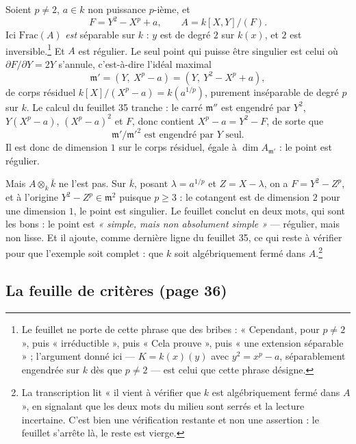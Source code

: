 \documentclass[11pt,a4paper]{article}
\begin{document}
Soient $p \neq 2$, $a \in k$ non puissance $p$-ième, et
\[
  F = Y^{2} - X^{p} + a , \qquad A = k[X,Y]/(F) .
\]
Ici $\mathrm{Frac}(A)$ \emph{est} séparable sur $k$ : $y$ est de degré $2$ sur
$k(x)$, et $2$ est inversible.\footnote{Le feuillet ne porte de cette phrase que des bribes : « Cependant,
pour $p \neq 2$ », puis « irréductible », puis « Cela prouve », puis « une
extension séparable » ; l'argument donné ici — $K = k(x)(y)$
avec $y^2 = x^p - a$, séparablement engendrée sur $k$ dès que $p \neq 2$ — est
celui que cette phrase désigne.} Et $A$ est régulier. Le seul point qui puisse
être singulier est celui où $\partial F/\partial Y = 2Y$ s'annule, c'est-à-dire
l'idéal maximal
\[
  \mathfrak{m}' = (Y,\ X^{p} - a) = (Y,\ Y^{2} - X^{p} + a) ,
\]
de corps résiduel $k[X]/(X^{p}-a) = k(a^{1/p})$, purement inséparable de degré
$p$ sur $k$. Le calcul du feuillet 35 tranche : le carré $\mathfrak{m}''$ est
engendré par $Y^{2}$, $Y(X^{p}-a)$, $(X^{p}-a)^{2}$ et $F$, donc contient
$X^{p}-a = Y^{2} - F$, de sorte que
\[
  \mathfrak{m}'/\mathfrak{m}'^{2} \text{ est engendré par } Y \text{ seul} .
\]
Il est donc de dimension $1$ sur le corps résiduel, égale à
$\dim A_{\mathfrak{m}'}$ : le point est régulier.

Mais $A \otimes_{k} \overline{k}$ ne l'est pas. Sur $\overline{k}$, posant
$\lambda = a^{1/p}$ et $Z = X - \lambda$, on a $F = Y^{2} - Z^{p}$, et à
l'origine $Y^{2} - Z^{p} \in \mathfrak{m}^{2}$ puisque $p \geqslant 3$ : le
cotangent est de dimension $2$ pour une dimension $1$, le point est singulier.
Le feuillet conclut en deux mots, qui sont les bons : le point est
\emph{« simple, mais non absolument simple »} — régulier, mais non lisse. Et il
ajoute, comme dernière ligne du feuillet 35, ce qui reste à vérifier pour que
l'exemple soit complet : que $k$ soit algébriquement fermé dans
$A$.\footnote{La transcription lit « il vient à vérifier que $k$ est
algébriquement fermé dans $A$ », en signalant que les deux mots du milieu sont
serrés et la lecture incertaine. C'est bien une vérification restante et non
une assertion : le feuillet s'arrête là, le reste est vierge.}

\subsection*{La feuille de critères (page 36)}
\end{document}
